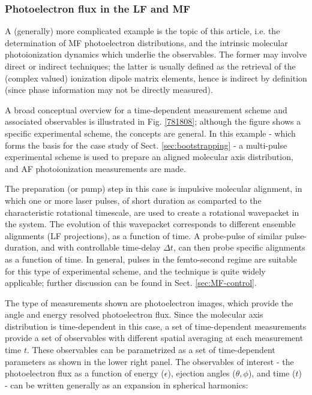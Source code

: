 \documentclass[10pt]{article}
\begin{document}
\subsubsection{Photoelectron flux in the LF and MF\label{sec:flux-intro}}

A (generally) more complicated example is the topic of this article, i.e. the determination of MF photoelectron distributions, and the intrinsic molecular photoionization dynamics which underlie the observables.  The former may involve direct or indirect techniques; the latter is usually defined as the retrieval of the (complex valued) ionization dipole matrix elements, hence is indirect by definition (since phase information may not be directly measured). 

A broad conceptual overview for a time-dependent measurement scheme and associated observables is illustrated in Fig. \ref{781808}; although the figure shows a specific experimental scheme, the concepts are general. In this example - which forms the basis for the case study of Sect. \ref{sec:bootstrapping} - a multi-pulse experimental scheme is used to prepare an aligned molecular axis distribution, and AF photoionization measurements are made.

The preparation (or pump) step in this case is impulsive molecular alignment, in which one or more laser pulses, of short duration as comparted to
the characteristic rotational timescale, are used to create a rotational wavepacket in the system. The evolution of this wavepacket corresponds to different ensemble alignments (LF projections), as a function of time. A probe-pulse of similar pulse-duration, and with controllable time-delay $\Delta t$, can then probe specific alignments as a function of time. In general, pulses in the femto-second regime are suitable for this type of experimental scheme, and the technique is quite widely applicable; further discussion can be found in Sect. \ref{sec:MF-control}.

The type of measurements shown are photoelectron images, which provide the angle and energy resolved photoelectron flux. Since the molecular axis distribution is time-dependent in this case,
a set of time-dependent measurements provide a set of observables with different spatial averaging at each measurement time $t$. These observables can be parametrized as a set of time-dependent parameters as shown in the lower right panel. The observables of interest - the photoelectron flux as a function of energy ($\epsilon$), ejection angles ($\theta,\phi$), and time ($t$) - can be written generally as an expansion in spherical harmonics:
\end{document}
